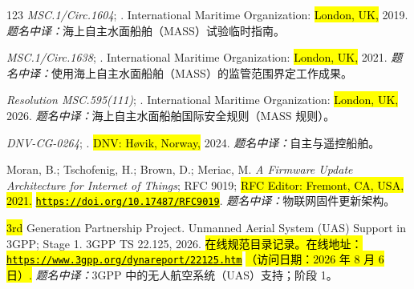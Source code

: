 \begin{thebibliography}{123}
\emph{MSC.1/Circ.1604};
. International Maritime Organization: \hl{London, UK,}  2019.
\newblock \textit{题名中译：}海上自主水面船舶（MASS）试验临时指南。

\emph{MSC.1/Circ.1638};
.  International Maritime Organization: \hl{London, UK,} 2021.
\newblock \textit{题名中译：}使用海上自主水面船舶（MASS）的监管范围界定工作成果。

\emph{Resolution MSC.595(111)};
. International Maritime Organization: \hl{London, UK,} 2026.
\newblock \textit{题名中译：}海上自主水面船舶国际安全规则（MASS 规则）。

\emph{DNV-CG-0264};
. \hl{DNV: Høvik, Norway,} 2024.
\newblock \textit{题名中译：}自主与遥控船舶。

Moran, B.; Tschofenig, H.; Brown, D.; Meriac, M.
\newblock \emph{A Firmware Update Architecture for Internet of Things};
\newblock RFC 9019; \hl{RFC Editor: Fremont, CA, USA,} \hl{2021.} \newblock \href{https://doi.org/10.17487/RFC9019}{\hl{\mbox{\nolinkurl{https://doi.org/}}}}\allowbreak\href{https://doi.org/10.17487/RFC9019}{\hl{\mbox{\nolinkurl{10.17487/}}}}\allowbreak\href{https://doi.org/10.17487/RFC9019}{\hl{\mbox{\nolinkurl{RFC9019}}}}.
\newblock \textit{题名中译：}物联网固件更新架构。

{\hl{3rd}  Generation Partnership Project}.
\newblock Unmanned Aerial System ({UAS}) Support in {3GPP}; Stage 1.
\newblock 3GPP TS 22.125,  2026.
\newblock \hl{在线规范目录记录。}\space \hl{在线地址：}\space \href{https://www.3gpp.org/dynareport/22125.htm}{\hl{\mbox{\nolinkurl{https://www.3gpp.org/}}}}\allowbreak\href{https://www.3gpp.org/dynareport/22125.htm}{\hl{\mbox{\nolinkurl{dynareport/}}}}\allowbreak\href{https://www.3gpp.org/dynareport/22125.htm}{\hl{\mbox{\nolinkurl{22125.htm}}}} \space\hl{（访问日期：2026 年 8 月 6 日）.}
\newblock \textit{题名中译：}3GPP 中的无人航空系统（UAS）支持；阶段 1。


\end{thebibliography}
